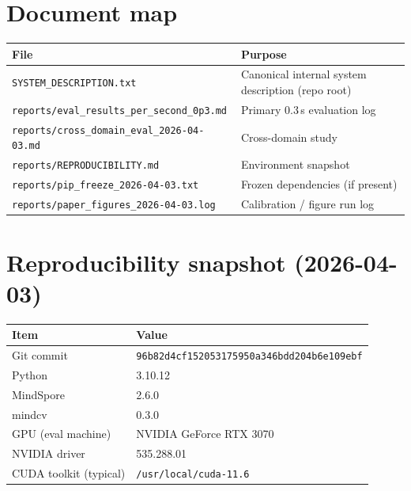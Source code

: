 
\section{Document map}
\label{app:map}

\begin{table}[h]
  \centering
  \small
  \begin{tabular}{@{}ll@{}}
    \toprule
    File & Purpose \\
    \midrule
    \texttt{SYSTEM\_DESCRIPTION.txt} & Canonical internal system description (repo root) \\
    \texttt{reports/eval\_results\_per\_second\_0p3.md} & Primary 0.3\,s evaluation log \\
    \texttt{reports/cross\_domain\_eval\_2026-04-03.md} & Cross-domain study \\
    \texttt{reports/REPRODUCIBILITY.md} & Environment snapshot \\
    \texttt{reports/pip\_freeze\_2026-04-03.txt} & Frozen dependencies (if present) \\
    \texttt{reports/paper\_figures\_2026-04-03.log} & Calibration / figure run log \\
    \bottomrule
  \end{tabular}
\end{table}

\section{Reproducibility snapshot (2026-04-03)}
\label{app:repro}

\begin{table}[h]
  \centering
  \begin{tabular}{@{}ll@{}}
    \toprule
    Item & Value \\
    \midrule
    Git commit & \texttt{96b82d4cf152053175950a346bdd204b6e109ebf} \\
    Python & 3.10.12 \\
    MindSpore & 2.6.0 \\
    mindcv & 0.3.0 \\
    GPU (eval machine) & NVIDIA GeForce RTX 3070 \\
    NVIDIA driver & 535.288.01 \\
    CUDA toolkit (typical) & \texttt{/usr/local/cuda-11.6} \\
    \bottomrule
  \end{tabular}
\end{table}

